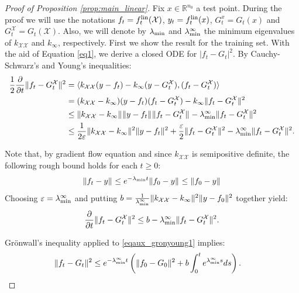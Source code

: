 \documentclass{article}
\theoremstyle{definition}
\theoremstyle{remark}
\numberwithin{equation}{section}
\newcommand{\X}{\mathcal{X}}
\newcommand{\R}{\mathbb{R}}
\newcommand{\eps}{{\varepsilon}}
\newcommand{\ktrain}{k_{\X\X}}
\newcommand{\lin}{{\textup{lin}}}
\newcommand{\lammin}{\lambda_{\textup{min}}}
\newcommand{\norm}[2]{
    \|#1\|_{#2}
}
\begin{document}
\begin{proof}[Proof of Proposition \ref{prop:main_linear}]

Fix $x \in \R^{n_0}$ a test point.
During the proof we will use the notations $f_t = f_t^\lin(\X)$, $y_t = f_t^\lin(x)$, $G_t^x = G_t(x)$ and $G_t^\X = G_t(\X)$.
Also, we will denote by $\lammin$ and $\lammin^\infty$ the minimum eigenvalues of $\ktrain$ and $k_\infty$, respectively.
First we show the result for the training set.
With the aid of Equation \eqref{eq1}, we derive a closed ODE for $\vert f_t-G_t\vert^2$.
By Cauchy-Schwarz's and Young's inequalities:
    \begin{align}
        \frac{1}{2}\frac{\partial}{\partial t} \norm{f_t-G_t^\X}{}^2 &= \langle\ktrain (y-f_t)-k_\infty(y-G_t^\X), (f_t-G_t^\X)\rangle\\
        &= (\ktrain - k_\infty) (y-f_t) (f_t-G_t^\X)- k_\infty \norm{f_t-G_t^\X}{}^2 \\
        &\le \norm{\ktrain - k_\infty}{}\norm{y-f_t}{}\norm{f_t-G_t^\X}{}- \lammin^\infty \norm{f_t-G_t^\X}{}^2 \\
        &\le \frac{1}{2\eps}\norm{\ktrain - k_\infty}{}^2\norm{y-f_t}{}^2 + \frac{\eps}{2} \norm{f_t-G_t^\X}{}^2 - \lammin^\infty \norm{f_t-G_t^\X}{}^2.
    \end{align}

Note that, by gradient flow equation and since $\ktrain$ is semipositive definite, the following rough bound holds for each $t \ge 0$:
\[\norm{f_t-y}{}\le e^{-\lammin t}\norm{f_0-y}{} \le \norm{f_0-y}{}\]
Choosing $\eps = \lammin^\infty$ and putting $b=\frac{1}{\lammin^\infty}\norm{\ktrain - k_\infty}{}^2\norm{y-f_0}{}^2$ together yield:
\begin{equation}
    \label{eqaux_gronyoung1}
    \frac{\partial}{\partial t} \norm{f_t-G_t^\X}{}^2 \le b - \lammin^\infty \norm{f_t-G_t^\X}{}^2.
\end{equation}

Grönwall's inequality applied to \eqref{eqaux_gronyoung1} implies:
\begin{align}
    \norm{f_t-G_t}{}^2 &\le e^{-\lammin^\infty t}\left(\norm{f_0-G_0}{}^2 + b\int_0^te^{\lammin^\infty s}ds\right).
\end{align}


\end{proof}
\end{document}

